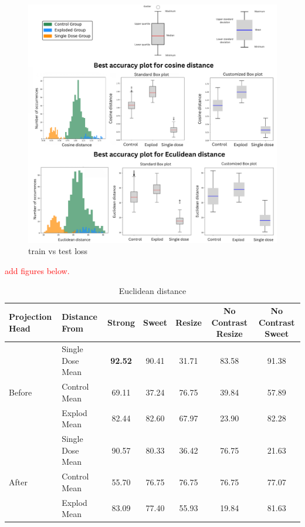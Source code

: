 \begin{figure}[H]
  \centering
  \includegraphics[scale=0.5]{figures/allbox.pdf} 
  \caption{train vs test loss}
  \label{fig:unloss}
\end{figure}

\textcolor{red}{ add figures below. }

\begin{table}[H]
  \centering
  \begin{tabular}{@{}llccccc@{}}
  \toprule
  Projection Head & Distance From      & Strong & Sweet & Resize & No Contrast Resize & No Contrast Sweet \\ \midrule
                  & Single Dose Mean   & \textbf{92.52}      & 90.41     & 31.71      & 83.58                  &  91.38                \\
  Before          & Control Mean       & 69.11      & 37.24     & 76.75      & 39.84                  & 57.89                 \\
                  & Explod Mean        & 82.44      & 82.60    & 67.97      & 23.90                  & 82.28                 \\ \midrule
                  & Single Dose Mean   & 90.57     & 80.33     & 36.42      & 76.75                  & 21.63                 \\
  After           & Control Mean       & 55.70      & 76.75     & 76.75      & 76.75                  & 77.07                 \\
                  & Explod Mean        & 83.09      & 77.40     & 55.93      & 19.84                  &  81.63                \\ \bottomrule
  \end{tabular}
  \caption{Euclidean distance}
  \label{tab:table_label}
\end{table}

